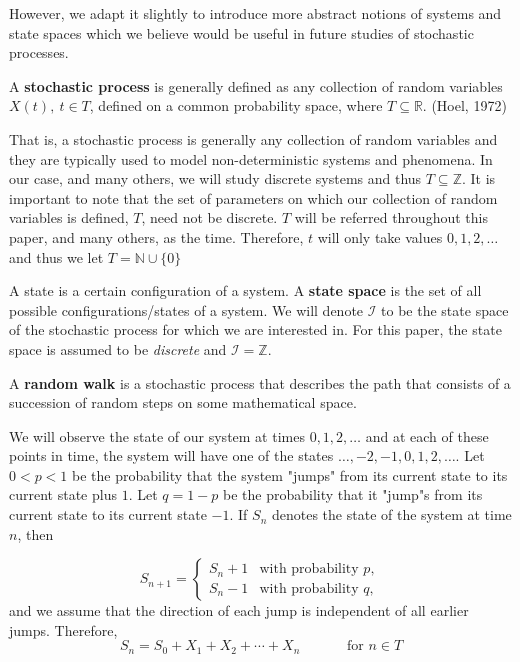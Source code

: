 \documentclass[12pt]{article}
\theoremstyle{definition}
\numberwithin{equation}{section}
\newcommand{\R}{\ensuremath{\mathbb{R}}}
\newcommand{\I}{\ensuremath{\mathcal{I}}}
\newcommand{\N}{\ensuremath{\mathbb{N}}}
\newcommand{\Z}{\ensuremath{\mathbb{Z}}}
\newcommand{\set}[1]{\{#1\}}
\begin{document}
However, we adapt it slightly to introduce more abstract notions of systems and state spaces which we believe would be useful in future studies of stochastic processes.

 A \textbf{stochastic process} is generally defined as any collection of random variables $X(t),\ t\in T$, defined on a common probability space, where $T\subseteq \R$. (Hoel, 1972)

That is, a stochastic process is generally any collection of random variables and they are typically used to model non-deterministic systems and phenomena. In our case, and many others, we will study discrete systems and thus $T\subseteq \Z$. It is important to note that the set of parameters on which our collection of random variables is defined, $T$, need not be discrete. $T$ will be referred throughout this paper, and many others, as the time. Therefore, $t$ will only take values $ 0,1,2,\ldots$ and thus we let $T = \N\cup\set{0}$\smallskip

 A state is a certain configuration of a system. A \textbf{state space} is the set of all possible configurations/states of a system. We will denote $\I$ to be the state space of the stochastic process for which we are interested in. For this paper, the state space is assumed to be \emph{discrete} and $\mathcal{I} = \Z$.

 A \textbf{random walk} is a stochastic process that describes the path that consists of a succession of random steps on some mathematical space.\smallskip

\noindent We will observe the state of our system at times $0,1,2,\ldots$ and at each of these points in time, the system will have one of the states $\ldots,-2,-1,0,1,2,\ldots$. Let $0<p<1$ be the probability that the system "jumps" from its current state to its current state plus $1$. Let $q = 1 - p$ be the probability that it "jump"s from its current state to its current state $-1$. If $S_n$ denotes the state of the system at time $n$, then

\begin{equation}
    S_{n + 1} = \begin{cases}
    S_n + 1 & \text{with probability $p$}, \\
    S_{n} - 1 & \text{with probability $q$},
    \end{cases}
\end{equation}
and we assume that the direction of each jump is independent of all earlier jumps. Therefore, 
\begin{equation}
S_n = S_0 + X_1 + X_2 + \cdots + X_n \hspace{40pt} \text{for $n \in T$}
\end{equation}
\end{document}
